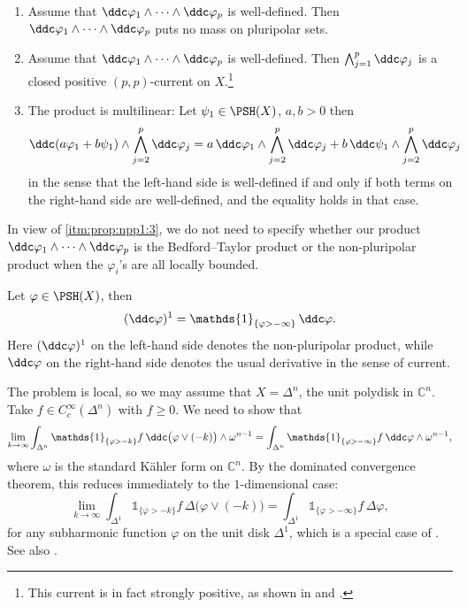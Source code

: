 \begin{proposition}
\begin{enumerate}
    \item\label{itm:prop:npp1:4} Assume that $\ddc \varphi_1\wedge\cdots\wedge \ddc \varphi_p$ is well-defined. Then $\ddc \varphi_1\wedge\cdots\wedge \ddc \varphi_p$ puts no mass on pluripolar sets.
    \item\label{itm:prop:npp1:5} Assume that $\ddc \varphi_1\wedge\cdots\wedge \ddc \varphi_p$ is well-defined. Then $\bigwedge_{j=1}^p \ddc \varphi_j$ is a closed positive $(p,p)$-current on $X$.\footnote{This current is in fact strongly positive, as shown in \cite{Xiabdiv2} and \cite[Proposition~15.1.4]{FPT}.}
    \item\label{itm:prop:npp1:6} The product is multilinear: Let $\psi_1\in \PSH(X)$, $a,b>0$ then
\begin{equation}\label{eq:ppp6}
\ddc (a\varphi_1+b\psi_1)\wedge \bigwedge_{j=2}^p \ddc \varphi_j =a\,\ddc \varphi_1\wedge \bigwedge_{j=2}^p \ddc \varphi_j + b\,\ddc \psi_1\wedge \bigwedge_{j=2}^p \ddc \varphi_j
\end{equation}
in the sense that the left-hand side is well-defined if and only if both terms on the right-hand side are well-defined, and the equality holds in that case.
\end{enumerate}
\end{proposition}
In view of \ref{itm:prop:npp1:3}, we do not need to specify whether our product $\ddc \varphi_1\wedge\cdots\wedge \ddc \varphi_p$ is the Bedford--Taylor product or the non-pluripolar product when the $\varphi_i$'s are all locally bounded.

\begin{example}\label{ex:1Dnpp}
    Let $\varphi\in \PSH(X)$, then
    \begin{equation}\label{eq:1dimnpp}
        (\ddc \varphi)^1=\mathds{1}_{\{\varphi>-\infty\}}\,\ddc\varphi.
    \end{equation}
    Here $(\ddc \varphi)^1$ on the left-hand side denotes the non-pluripolar product, while $\ddc\varphi$ on the right-hand side denotes the usual derivative in the sense of current.

    The problem is local, so we may assume that $X=\Delta^n$, the unit polydisk in $\mathbb{C}^n$. Take $f\in C^{\infty}_c(\Delta^n)$ with $f\geq 0$. We need to show that
    \[
        \lim_{k\to\infty} \int_{\Delta^n} \mathds{1}_{\{\varphi>-k\}}f\, \ddc \bigl(\varphi\lor (-k)\bigr)\wedge \omega^{n-1}=\int_{\Delta^n} \mathds{1}_{\{\varphi>-\infty\}}f\,\ddc\varphi\wedge \omega^{n-1},
    \]
    where $\omega$ is the standard Kähler form on $\mathbb{C}^n$. By the dominated convergence theorem, this reduces immediately to the $1$-dimensional case:
    \[
        \lim_{k\to\infty} \int_{\Delta^1} \mathds{1}_{\{\varphi>-k\}}f\, \Delta \bigl(\varphi\lor (-k)\bigr)=\int_{\Delta^1} \mathds{1}_{\{\varphi>-\infty\}}f\,\Delta\varphi,
    \]
    for any subharmonic function $\varphi$ on the unit disk $\Delta^1$, which is a special case of \cite[Proposition~3.3]{EK24}. See also \cite[Proposition~15.3.6]{FPT}.
\end{example}

